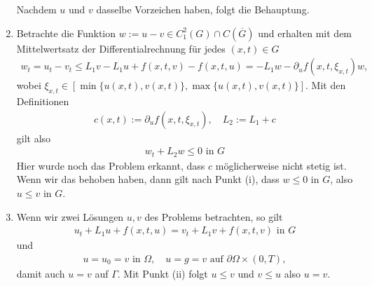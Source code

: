 \begin{solution}
\begin{enumerate}[label = (\roman*)]
  Nachdem $u$ und $v$ dasselbe Vorzeichen haben, folgt die Behauptung.

  \item Betrachte die Funktion $w := u - v \in C_1^2(G) \cap C(\overline{G})$ und erhalten mit dem Mittelwertsatz der Differentialrechnung für jedes $(x,t) \in G$
  \begin{align*}
    w_t = u_t - v_t \leq L_1 v - L_1 u + f(x, t, v) - f(x,t,u)  = -L_1w - \partial_u f(x,t,\xi_{x,t}) w,
  \end{align*}
  wobei $\xi_{x,t} \in [\min\{u(x,t), v(x,t)\}, \max\{u(x,t), v(x,t)\}]$. Mit den Definitionen
  \begin{align*}
	  c(x,t) := \partial_u f(x,t,\xi_{x,t}), \quad L_2 := L_1 + c
  \end{align*}
  gilt also 
  \begin{align*}
	  w_t + L_2w \leq 0 \text{ in } G
  \end{align*}
  Hier wurde noch das Problem erkannt, dass $c$ möglicherweise nicht stetig ist. Wenn wir das behoben haben, dann gilt nach Punkt (i), dass
  $w \leq 0$ in $G$, also $u \leq v$ in $G$.
  
  \item Wenn wir zwei Lösungen $u,v$ des Problems betrachten, so gilt 
  \begin{align*}
	  u_t + L_1 u + f(x,t,u) = v_t + L_1 v + f(x,t,v) \text{ in } G
  \end{align*}
  und 
  \begin{align*}
	  u = u_0 = v \text{ in } \Omega, \quad u = g = v \text{ auf } \partial \Omega \times (0,T),
  \end{align*}
  damit auch $u = v$ auf $\Gamma$. Mit Punkt (ii) folgt $u \leq v$ und $v \leq u$ also $u = v$. 
\end{enumerate}
\end{solution}

